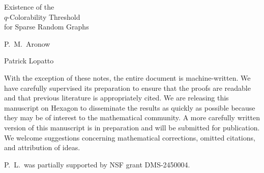 \documentclass[12pt,oneside,openany]{book}
\numberwithin{equation}{chapter}
\theoremstyle{plain}
\theoremstyle{definition}
\theoremstyle{remark}
\newcommand{\manuscripttitlepage}[2]{%
  \hypersetup{pageanchor=false}%
  \begin{titlepage}
  \centering\normalfont
  \vspace*{1.7in}
  {\large\strut\par}
  \vspace{1.05in}
  {\fontsize{28}{35}\selectfont #1\par}
  \vspace{1.1in}
  {\Large\def\\{\par\vspace{10pt}}#2\par}
  \vfill
  \end{titlepage}%
  \hypersetup{pageanchor=true}}
\begin{document}
\frontmatter
\manuscripttitlepage{Existence of the\\ $q$-Colorability Threshold\\ for Sparse Random Graphs}{P.\ M.\ Aronow\\ Patrick Lopatto}
\begin{authorsnote}
With the exception of these notes, the entire document is machine-written. We
have carefully supervised its preparation to ensure that the proofs are readable and
that previous literature is appropriately cited. We are releasing this manuscript
on Hexagon to disseminate the results as quickly as possible because they may be
of interest to the mathematical community. A more carefully written version of
this manuscript is in preparation and will be submitted for publication. We
welcome suggestions concerning mathematical corrections, omitted citations, and
attribution of ideas.

P.\ L.\ was partially supported by NSF grant DMS-2450004.
\end{authorsnote}
\begin{abstractpage}

\end{abstractpage}
\tableofcontents
\mainmatter





\backmatter

\setlength{\bibsep}{3pt plus 1pt minus 1pt}


\end{document}
